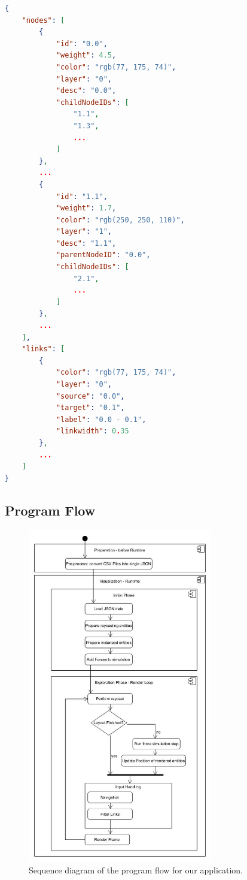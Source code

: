 \begin{lstlisting}[language=json,label={lst:internalJSON},caption=minimal JSON input data structure]
{
    "nodes": [
        {
            "id": "0.0",
            "weight": 4.5,
            "color": "rgb(77, 175, 74)",
            "layer": "0",
            "desc": "0.0",
            "childNodeIDs": [
                "1.1",
                "1.3",
                ...
            ]
        },
        ...
        {
            "id": "1.1",
            "weight": 1.7,
            "color": "rgb(250, 250, 110)",
            "layer": "1",
            "desc": "1.1",
            "parentNodeID": "0.0",
            "childNodeIDs": [
                "2.1",
                ...
            ]
        },
        ...
    ],
    "links": [
        {
            "color": "rgb(77, 175, 74)",
            "layer": "0",
            "source": "0.0",
            "target": "0.1",
            "label": "0.0 - 0.1",
            "linkwidth": 0.35
        },
        ...
    ]
}
\end{lstlisting}

\subsection{Program Flow}
\label{section:programFlow}
\begin{figure}[!hbt]
    \centering
    \includegraphics[width=0.72\textwidth]{graphics/vrgraph_flow.jpg}
    \caption{Sequence diagram of the program flow for our application.}
    \label{fig:impl_programFlow}
\end{figure}

